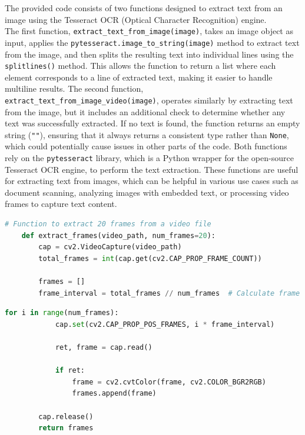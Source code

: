 \noindent
The provided code consists of two functions designed to extract text from an image using the Tesseract OCR (Optical Character Recognition) engine. \\
The first function, \texttt{extract\_text\_from\_image(image)}, takes an image object as input, applies the \texttt{pytesseract.image\_to\_string(image)} method to extract text from the image, and then splits the resulting text into individual lines using the \texttt{splitlines()} method. This allows the function to return a list where each element corresponds to a line of extracted text, making it easier to handle multiline results. The second function, \\ \texttt{extract\_text\_from\_image\_video(image)}, operates similarly by extracting text from the image, but it includes an additional check to determine whether any text was successfully extracted. If no text is found, the function returns an empty string (\texttt{""}), ensuring that it always returns a consistent type rather than \texttt{None}, which could potentially cause issues in other parts of the code. Both functions rely on the \texttt{pytesseract} library, which is a Python wrapper for the open-source Tesseract OCR engine, to perform the text extraction. These functions are useful for extracting text from images, which can be helpful in various use cases such as document scanning, analyzing images with embedded text, or processing video frames to capture text content.


\begin{tcolorbox}[colback=gray!5!white, colframe=gray!80!black, boxrule=0.5pt, title=Extract Frames from Video File]
    \begin{lstlisting}[language=Python]
    # Function to extract 20 frames from a video file
    def extract_frames(video_path, num_frames=20):
        cap = cv2.VideoCapture(video_path)
        total_frames = int(cap.get(cv2.CAP_PROP_FRAME_COUNT))

        frames = []
        frame_interval = total_frames // num_frames  # Calculate frame interval
    \end{lstlisting}
\end{tcolorbox}
\begin{tcolorbox}[colback=gray!5!white, colframe=gray!80!black, boxrule=0.5pt, title=Extract Frames from Video File]
    \begin{lstlisting}[language=Python]
        for i in range(num_frames):
            cap.set(cv2.CAP_PROP_POS_FRAMES, i * frame_interval)

            ret, frame = cap.read()

            if ret:
                frame = cv2.cvtColor(frame, cv2.COLOR_BGR2RGB)
                frames.append(frame)

        cap.release()
        return frames
    \end{lstlisting}
\end{tcolorbox}

